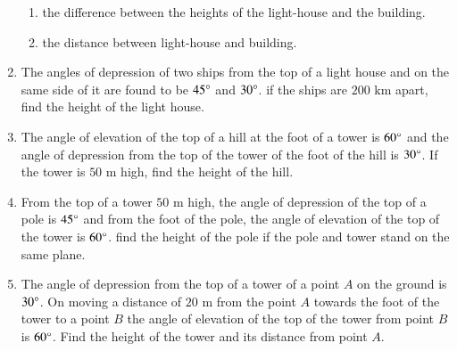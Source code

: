 \documentclass[journal,12pt,onecolumn]{IEEEtran}
\theoremstyle{remark}
\begin{document}
\begin{enumerate}
\begin{enumerate}[label=\Roman*.]
\item the difference between the heights of the light-house and the building. 
\item the distance between light-house and building. 
\end{enumerate}
\item The angles of depression of two ships from the top of a light house and on the same side of it are found to be $45\degree$ and $30\degree$. if the ships are $200 \text{ km}$ apart, find the height of the light house. 
\item The angle of elevation of the top of a hill at the foot of a tower is $60\degree$ and the angle of depression from the top of the tower of the foot of the hill is $30\degree$. If the tower is $50\text{ m}$ high, find the height of the hill. 
\item From the top of a tower $50\text{ m}$ high, the angle of depression of the top of a pole is $45\degree$ and from the foot of the pole, the angle of elevation of the top of the tower is $60\degree$. find the height of the pole if the pole and tower stand on the same plane. 
\item The angle of depression from the top of a tower of a point $A$ on the ground is $30\degree$. On moving a distance of $20\text{ m}$ from the point $A$ towards the foot of the tower to a point $B$ the angle of elevation of the top of the tower from point $B$ is $60\degree$. Find the height of the tower and its distance from point $A$.
\end{enumerate}
\end{document}
